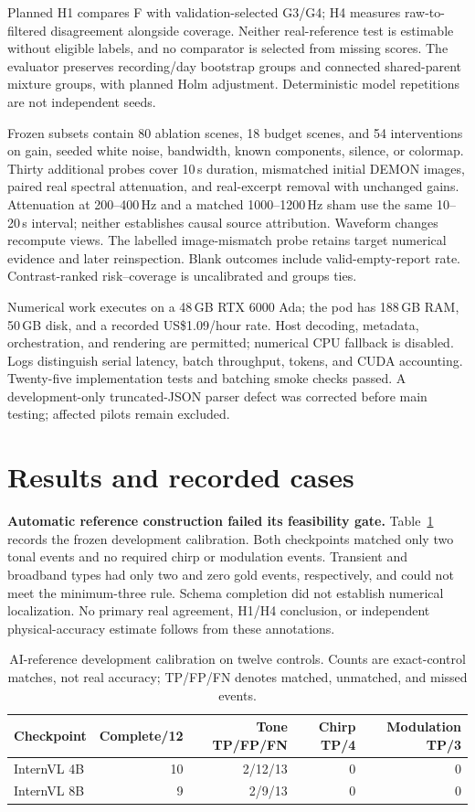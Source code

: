 \documentclass[runningheads,orivec]{llncs}
\begin{document}
Planned H1 compares F with validation-selected G3/G4; H4 measures raw-to-filtered disagreement alongside coverage. Neither real-reference test is estimable without eligible labels, and no comparator is selected from missing scores. The evaluator preserves recording/day bootstrap groups and connected shared-parent mixture groups, with planned Holm adjustment. Deterministic model repetitions are not independent seeds.

Frozen subsets contain 80 ablation scenes, 18 budget scenes, and 54 interventions on gain, seeded white noise, bandwidth, known components, silence, or colormap. Thirty additional probes cover 10\,s duration, mismatched initial DEMON images, paired real spectral attenuation, and real-excerpt removal with unchanged gains. Attenuation at 200--400\,Hz and a matched 1000--1200\,Hz sham use the same 10--20\,s interval; neither establishes causal source attribution. Waveform changes recompute views. The labelled image-mismatch probe retains target numerical evidence and later reinspection. Blank outcomes include valid-empty-report rate. Contrast-ranked risk--coverage is uncalibrated and groups ties.

Numerical work executes on a 48\,GB RTX 6000 Ada; the pod has 188\,GB RAM, 50\,GB disk, and a recorded US\$1.09/hour rate. Host decoding, metadata, orchestration, and rendering are permitted; numerical CPU fallback is disabled. Logs distinguish serial latency, batch throughput, tokens, and CUDA accounting. Twenty-five implementation tests and batching smoke checks passed. A development-only truncated-JSON parser defect was corrected before main testing; affected pilots remain excluded.

\section{Results and recorded cases}
\textbf{Automatic reference construction failed its feasibility gate.} Table~\ref{tab:annotation} records the frozen development calibration. Both checkpoints matched only two tonal events and no required chirp or modulation events. Transient and broadband types had only two and zero gold events, respectively, and could not meet the minimum-three rule. Schema completion did not establish numerical localization. No primary real agreement, H1/H4 conclusion, or independent physical-accuracy estimate follows from these annotations.

\begin{table}[tb]
\caption{AI-reference development calibration on twelve controls. Counts are exact-control matches, not real accuracy; TP/FP/FN denotes matched, unmatched, and missed events.}
\label{tab:annotation}\centering\small
\begin{tabular}{@{}lrrrr@{}}\toprule
Checkpoint & Complete/12 & Tone TP/FP/FN & Chirp TP/4 & Modulation TP/3 \\\midrule
InternVL 4B & 10 & 2/12/13 & 0 & 0 \\
InternVL 8B & 9 & 2/9/13 & 0 & 0 \\\bottomrule
\end{tabular}
\end{table}
\end{document}
